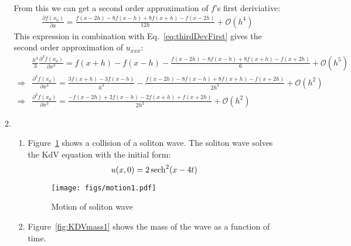 \documentclass[12pt,a4]{article}
\begin{document}
\begin{enumerate}
\begin{enumerate}
\begin{align*}
        \end{align*}
        From this we can get a second order approximation of $f$'s first deriviative:
        \begin{align*}
          \frac{\partial f(x_0)}{\partial x} = \frac{f(x - 2 h)- 8 f(x - h) + 8 f(x + h) - f(x - 2 h)}{12 h} + \mathscr{O}(h^4) %
        \end{align*}
        This expression in combination with Eq.~\ref{eq:thirdDevFirst} gives the second order approximation of $u_{xxx}$:
        \begin{align*}
                      & \frac{h^3}{3} \frac{\partial^3 f(x_0)}{\partial x^3} = f(x + h) - f(x - h) - \frac{f(x - 2 h)- 8 f(x - h) + 8 f(x + h) - f(x + 2 h)}{6} + \mathscr{O}(h^5)\\ %
          \Rightarrow & \frac{\partial^3 f(x_0)}{\partial x^3} = \frac{3 f(x + h) - 3 f(x - h)}{h^3} - \frac{f(x - 2 h)- 8 f(x - h) + 8 f(x + h) - f(x + 2 h)}{2 h^3} + \mathscr{O}(h^2)\\ %
          \Rightarrow & \frac{\partial^3 f(x_0)}{\partial x^3} = \frac{- f(x - 2 h) + 2 f(x - h) - 2 f(x + h) + f(x +  2 h)}{2 h^3} + \mathscr{O}(h^2) %
        \end{align*}
      \item
        \begin{enumerate}
          \item
            Figure~\ref{fig:motion1} shows a collision of a soliton wave.
            The soliton wave solves the KdV equation with the initial form:
            \begin{equation*}
              u(x, 0) = 2 \sech ^ 2 (x - 4t)
            \end{equation*}
            \begin{figure}[H]
              \centering
              \texttt{[image: figs/motion1.pdf]}
              \caption{Motion of soliton wave}
              \label{fig:motion1}
            \end{figure}
          \item
            Figure~\ref{fig:KDVmass1} shows the mass of the wave as a function of time.
            \begin{figure}[H]
              \centering

\end{figure}
\end{enumerate}
\end{enumerate}
\end{enumerate}
\end{document}
